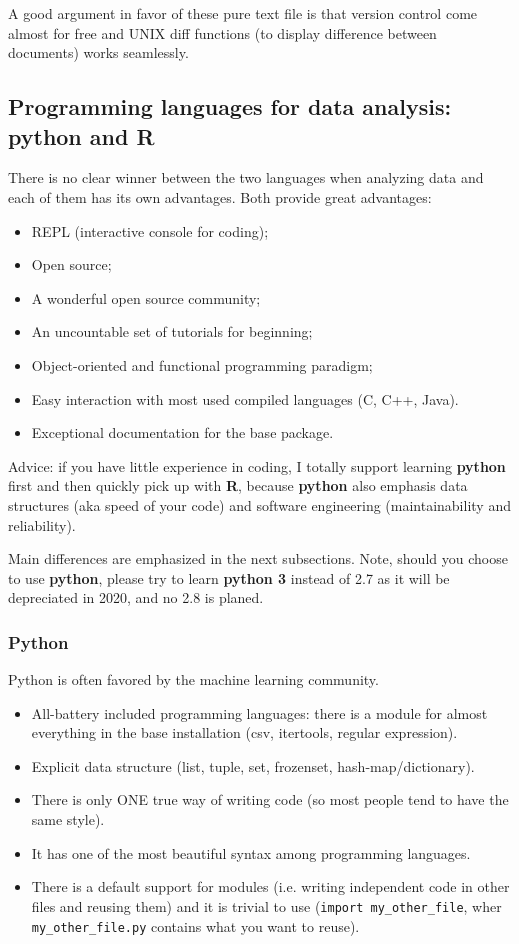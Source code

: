\documentclass[11pt]{article}
\begin{document}
A good argument in favor of these pure text file is that version control
come almost for free and UNIX diff functions (to display difference between
documents) works seamlessly.


\subsection{Programming languages for data analysis:  \textbf{python} and \textbf{R}}
\label{sec:orge4e3823}

There is no clear winner between the two languages when analyzing data and
each of them has its own advantages. Both provide great advantages:

\begin{itemize}
\item REPL (interactive console for coding);
\item Open source;
\item A wonderful open source community;
\item An uncountable set of tutorials for beginning;
\item Object-oriented and functional programming paradigm;
\item Easy interaction with most used compiled languages (C, C++, Java).
\item Exceptional documentation for the base package.
\end{itemize}

Advice: if you have little experience in coding, I totally support learning
\textbf{python} first and then quickly pick up with \textbf{R}, because \textbf{python} also
emphasis data structures (aka speed of your code) and software engineering
(maintainability and reliability).

Main differences are emphasized in the next subsections. Note, should you
choose to use \textbf{python}, please try to learn \textbf{python 3} instead of 2.7 as it
will be depreciated in 2020, and no 2.8 is planed.

\subsubsection{Python}
\label{sec:orgb666a9b}
Python is often favored by the machine learning community.
\begin{itemize}
\item All-battery included programming languages: there is a module for almost
everything in the base installation (csv, itertools, regular expression).
\item Explicit data structure (list, tuple, set, frozenset, hash-map/dictionary).
\item There is only ONE true way of writing code (so most people tend to have
the same style).
\item It has one of the most beautiful syntax among programming languages.
\item There is a default support for modules (i.e. writing independent code in
other files and reusing them) and it is trivial to use (\texttt{import
      my\_other\_file}, wher \texttt{my\_other\_file.py} contains what you want to reuse).
\end{itemize}
\end{document}
